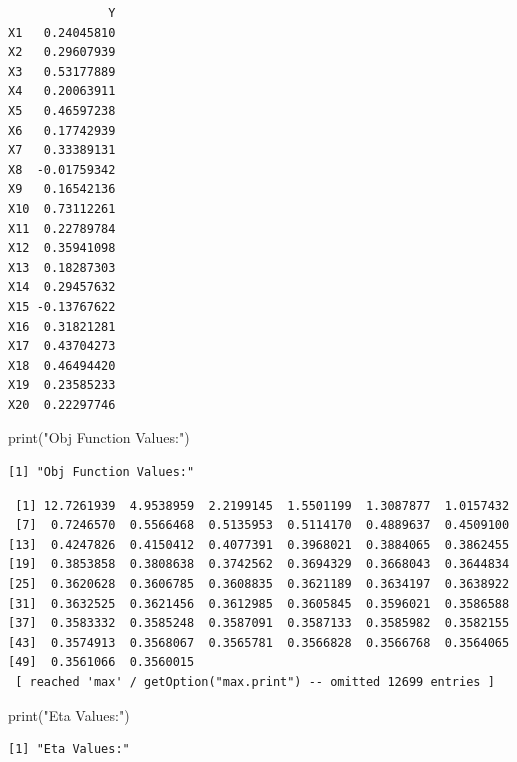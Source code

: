\documentclass[
  letterpaper,
  DIV=11,
  numbers=noendperiod]{scrartcl}
\newenvironment{Shaded}{\begin{snugshade}}{\end{snugshade}}
\newcommand{\FunctionTok}[1]{\textcolor[rgb]{0.28,0.35,0.67}{#1}}
\newcommand{\NormalTok}[1]{\textcolor[rgb]{0.00,0.23,0.31}{#1}}
\newcommand{\SpecialCharTok}[1]{\textcolor[rgb]{0.37,0.37,0.37}{#1}}
\newcommand{\StringTok}[1]{\textcolor[rgb]{0.13,0.47,0.30}{#1}}
\begin{document}
\begin{verbatim}
              Y
X1   0.24045810
X2   0.29607939
X3   0.53177889
X4   0.20063911
X5   0.46597238
X6   0.17742939
X7   0.33389131
X8  -0.01759342
X9   0.16542136
X10  0.73112261
X11  0.22789784
X12  0.35941098
X13  0.18287303
X14  0.29457632
X15 -0.13767622
X16  0.31821281
X17  0.43704273
X18  0.46494420
X19  0.23585233
X20  0.22297746
\end{verbatim}

\begin{Shaded}
\begin{Highlighting}[]
\FunctionTok{print}\NormalTok{(}\StringTok{"Obj Function Values:"}\NormalTok{)}
\end{Highlighting}
\end{Shaded}

\begin{verbatim}
[1] "Obj Function Values:"
\end{verbatim}

\begin{Shaded}
\end{Shaded}

\begin{verbatim}
 [1] 12.7261939  4.9538959  2.2199145  1.5501199  1.3087877  1.0157432
 [7]  0.7246570  0.5566468  0.5135953  0.5114170  0.4889637  0.4509100
[13]  0.4247826  0.4150412  0.4077391  0.3968021  0.3884065  0.3862455
[19]  0.3853858  0.3808638  0.3742562  0.3694329  0.3668043  0.3644834
[25]  0.3620628  0.3606785  0.3608835  0.3621189  0.3634197  0.3638922
[31]  0.3632525  0.3621456  0.3612985  0.3605845  0.3596021  0.3586588
[37]  0.3583332  0.3585248  0.3587091  0.3587133  0.3585982  0.3582155
[43]  0.3574913  0.3568067  0.3565781  0.3566828  0.3566768  0.3564065
[49]  0.3561066  0.3560015
 [ reached 'max' / getOption("max.print") -- omitted 12699 entries ]
\end{verbatim}

\begin{Shaded}
\begin{Highlighting}[]
\FunctionTok{print}\NormalTok{(}\StringTok{"Eta Values:"}\NormalTok{)}
\end{Highlighting}
\end{Shaded}

\begin{verbatim}
[1] "Eta Values:"
\end{verbatim}
\end{document}
